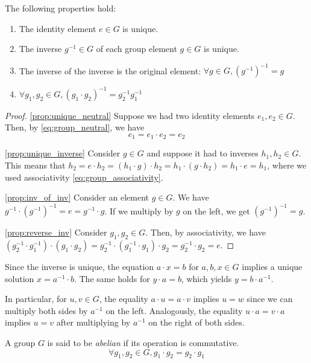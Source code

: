 \begin{proposition}
    The following properties hold:
    \begin{enumerate}
        \item The identity element $e \in G$ is unique. \label{prop:unique_neutral}
        \item The inverse $g^{-1} \in G$ of each group element $g \in G$ is unique. \label{prop:unique_inverse}
        \item The inverse of the inverse is the original element: $\forall g \in G, (g^{-1})^{-1} = g$ \label{prop:inv_of_inv}
        \item $\forall g_1, g_2 \in G, (g_1 \cdot g_2)^{-1} = g_2^{-1} g_1^{-1}$ \label{prop:reverse_inv}
    \end{enumerate}
\end{proposition}
\begin{proof}
    \eqref{prop:unique_neutral}
    Suppose we had two identity elements $e_1, e_2 \in G$.
    Then, by \eqref{eq:group_neutral}, we have
    \begin{equation*}
        e_1 = e_1 \cdot e_2 = e_2
    \end{equation*}

    \eqref{prop:unique_inverse}
    Consider $g \in G$ and suppose it had to inverses $h_1, h_2 \in G$.
    This means that $h_2 = e \cdot h_2 = (h_1 \cdot g) \cdot h_2 = h_1 \cdot (g \cdot h_2) = h_1 \cdot e = h_1$, where we used associativity \eqref{eq:group_associativity}.

    \eqref{prop:inv_of_inv}
    Consider an element $g \in G$. We have $g^{-1} \cdot (g^{-1})^{-1} = e = g^{-1} \cdot g$. If we multiply by $g$ on the left, we get $(g^{-1})^{-1} = g$.

    \eqref{prop:reverse_inv}
    Consider $g_1, g_2 \in G$. Then, by associativity, we have $(g_2^{-1} \cdot g_1^{-1}) \cdot (g_1 \cdot g_2) = g_2^{-1} \cdot (g_1^{-1} \cdot g_1) \cdot g_2 = g_2^{-1} \cdot g_2 = e$.
\end{proof}

\begin{remark}
    Since the inverse is unique, the equation $a \cdot x = b$ for $a, b, x \in G$ implies a unique solution $x = a^{-1} \cdot b$. The same holds for $y \cdot a = b$, which yields $y = b \cdot a^{-1}$.

    In particular, for $u, v \in G$, the equality $a \cdot u = a \cdot v$ implies $u = w$ since we can multiply both sides by $a^{-1}$ on the left. Analogously, the equality $u \cdot a = v \cdot a$ implies $u = v$ after multiplying by $a^{-1}$ on the right of both sides.
\end{remark}

\begin{definition}
    A group $G$ is said to be \emph{abelian} if its operation is commutative.
    \begin{equation}
        \forall g_1, g_2 \in G, g_1 \cdot g_2 = g_2 \cdot g_1
        \label{eq:abelian_group}
    \end{equation}
\end{definition}